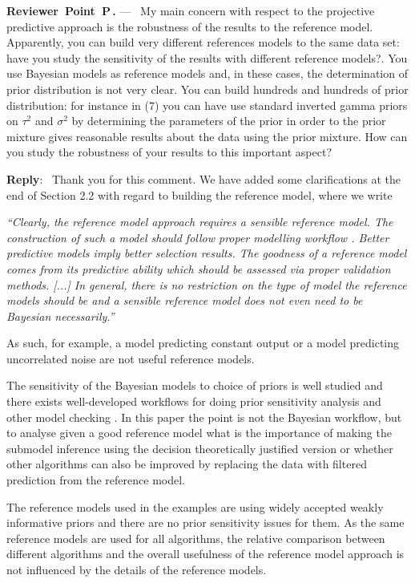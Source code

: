 \documentclass[11pt]{article}
\newcounter{reviewer}
\newcounter{point}[reviewer]
\renewcommand{\thepoint}{P\,\thereviewer.\arabic{point}}
\newenvironment{point}
   {\refstepcounter{point} \bigskip \noindent \begin{sf}{\textbf{Reviewer~Point~\thepoint} } ---\ }
   {\par \end{sf}}
\newenvironment{reply}
   {\medskip \noindent \textbf{Reply}:\  }
   {\medskip}
\begin{document}
\begin{point}
My main concern with respect to the projective predictive approach is the robustness of the results to the reference model. Apparently, you can build very different references models to the same data set: have you study the sensitivity of the results with different reference models?. You use Bayesian models as reference models and, in these cases, the determination of prior distribution is not very clear. You can build hundreds and hundreds of prior distribution: for instance in (7) you can have use standard inverted gamma priors on $\tau^2$ and $\sigma^2$ by determining the parameters of the prior in order to the prior mixture gives reasonable results about the data using the prior mixture. How can you study the robustness of your results to this important aspect?
\end{point}

\begin{reply}
Thank you for this comment. We have added some clarifications at the end of Section 2.2 with regard to building the reference model, where we write

\vspace{0.5cm}
\textit{
``Clearly, the reference model approach requires a sensible reference model. The construction of such a model should follow proper modelling workflow \citep[see, e.g.][]{gelman2020bayesian}. Better predictive models imply better selection results. The goodness of a reference model comes from its predictive ability which should be assessed via proper validation methods. [...] In general, there is no restriction on the type of model the reference models should be and a sensible reference model does not even need to be Bayesian necessarily.''
}
\vspace{0.5cm}

As such, for example, a model predicting constant output or a model predicting uncorrelated noise are not useful reference models.

The sensitivity of the Bayesian models to choice of priors is well studied and there exists well-developed workflows for doing prior sensitivity analysis and other model checking \citep[see, e.g.][]{gelman2020bayesian}. In this paper the point is not the Bayesian workflow, but to analyse given a good reference model what is the importance of making the submodel inference using the decision theoretically justified version or whether other algorithms can also be improved by replacing the data with filtered prediction from the reference model. 

The reference models used in the examples are using widely accepted weakly informative priors and there are no prior sensitivity issues for them. As the same reference models are used for all algorithms, the relative comparison between different algorithms and the overall usefulness of the reference model approach is not influenced by the details of the reference models.
\end{reply}
\end{document}
